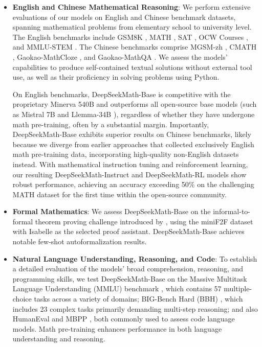 \begin{itemize}[topsep=0pt]
    \item \textbf{English and Chinese Mathematical Reasoning}: We perform extensive evaluations of our models on English and Chinese benchmark datasets, spanning mathematical problems from elementary school to university level. The English benchmarks include GSM8K \citep{gsm8k}, MATH \citep{MATH}, SAT \citep{llemma}, OCW Courses \citep{minerva}, and MMLU-STEM \citep{mmlu}. The Chinese benchmarks comprise MGSM-zh \citep{mgsm}, CMATH \citep{wei2023cmath}, Gaokao-MathCloze \citep{agieval}, and Gaokao-MathQA \citep{agieval}. We assess the models’ capabilities to produce self-contained textual solutions without external tool use, as well as their proficiency in solving problems using Python.
    
    On English benchmarks, DeepSeekMath-Base is competitive with the proprietary Minerva 540B \citep{minerva} and outperforms all open-source base models (such as Mistral 7B \citep{mistral} and Llemma-34B \citep{llemma}), regardless of whether they have undergone math pre-training, often by a substantial margin. Importantly, DeepSeekMath-Base exhibits superior results on Chinese benchmarks, likely because we diverge from earlier approaches \citep{minerva,llemma} that collected exclusively English math pre-training data, incorporating high-quality non-English datasets instead. With mathematical instruction tuning and reinforcement learning, our resulting DeepSeekMath-Instruct and DeepSeekMath-RL models show robust performance, achieving an accuracy exceeding 50\% on the challenging MATH dataset for the first time within the open-source community.
\end{itemize}

\begin{itemize}
    \item \textbf{Formal Mathematics}: We assess DeepSeekMath-Base on the informal-to-formal theorem proving challenge introduced by \citep{dsp_proof}, using the miniF2F dataset \citep{minif2f} with Isabelle \citep{isabelle} as the selected proof assistant. DeepSeekMath-Base achieves notable few-shot autoformalization results.
    \item \textbf{Natural Language Understanding, Reasoning, and Code}: To establish a detailed evaluation of the models' broad comprehension, reasoning, and programming skills, we test DeepSeekMath-Base on the Massive Multitask Language Understanding (MMLU) benchmark \citep{mmlu}, which contains 57 multiple-choice tasks across a variety of domains; BIG-Bench Hard (BBH) \citep{bbh}, which includes 23 complex tasks primarily demanding multi-step reasoning; and also HumanEval \citep{codex} and MBPP \citep{mbpp}, both commonly used to assess code language models. Math pre-training enhances performance in both language understanding and reasoning.
\end{itemize}

